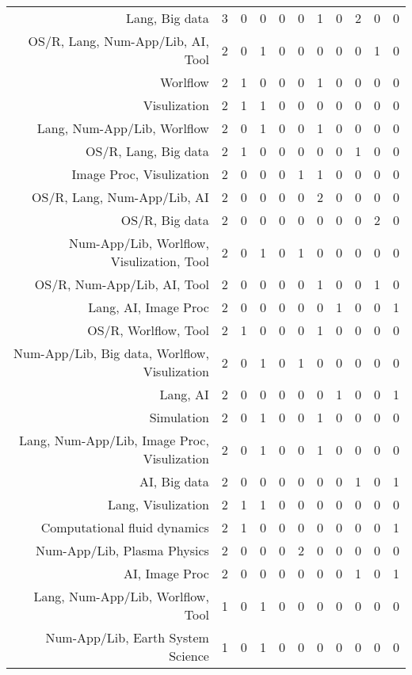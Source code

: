{\begin{landscape}
\begin{longtable}[htb]{r|c|c|c|c|c|c|c|c|c|c}
{Lang, Big data} & 3 & 0 & 0 & 0 & 0 & 1 & 0 & 2 & 0 & 0 \\%
{OS/R, Lang, Num-App/Lib, AI, Tool} & 2 & 0 & 1 & 0 & 0 & 0 & 0 & 0 & 1 & 0 \\%
{Worlflow} & 2 & 1 & 0 & 0 & 0 & 1 & 0 & 0 & 0 & 0 \\%
{Visulization} & 2 & 1 & 1 & 0 & 0 & 0 & 0 & 0 & 0 & 0 \\%
{Lang, Num-App/Lib, Worlflow} & 2 & 0 & 1 & 0 & 0 & 1 & 0 & 0 & 0 & 0 \\%
{OS/R, Lang, Big data} & 2 & 1 & 0 & 0 & 0 & 0 & 0 & 1 & 0 & 0 \\%
{Image Proc, Visulization} & 2 & 0 & 0 & 0 & 1 & 1 & 0 & 0 & 0 & 0 \\%
{OS/R, Lang, Num-App/Lib, AI} & 2 & 0 & 0 & 0 & 0 & 2 & 0 & 0 & 0 & 0 \\%
{OS/R, Big data} & 2 & 0 & 0 & 0 & 0 & 0 & 0 & 0 & 2 & 0 \\%
{Num-App/Lib, Worlflow, Visulization, Tool} & 2 & 0 & 1 & 0 & 1 & 0 & 0 & 0 & 0 & 0 \\%
{OS/R, Num-App/Lib, AI, Tool} & 2 & 0 & 0 & 0 & 0 & 1 & 0 & 0 & 1 & 0 \\%
{Lang, AI, Image Proc} & 2 & 0 & 0 & 0 & 0 & 0 & 1 & 0 & 0 & 1 \\%
{OS/R, Worlflow, Tool} & 2 & 1 & 0 & 0 & 0 & 1 & 0 & 0 & 0 & 0 \\%
{Num-App/Lib, Big data, Worlflow, Visulization} & 2 & 0 & 1 & 0 & 1 & 0 & 0 & 0 & 0 & 0 \\%
{Lang, AI} & 2 & 0 & 0 & 0 & 0 & 0 & 1 & 0 & 0 & 1 \\%
{Simulation} & 2 & 0 & 1 & 0 & 0 & 1 & 0 & 0 & 0 & 0 \\%
{Lang, Num-App/Lib, Image Proc, Visulization} & 2 & 0 & 1 & 0 & 0 & 1 & 0 & 0 & 0 & 0 \\%
{AI, Big data} & 2 & 0 & 0 & 0 & 0 & 0 & 0 & 1 & 0 & 1 \\%
{Lang, Visulization} & 2 & 1 & 1 & 0 & 0 & 0 & 0 & 0 & 0 & 0 \\%
{Computational fluid dynamics} & 2 & 1 & 0 & 0 & 0 & 0 & 0 & 0 & 0 & 1 \\%
{Num-App/Lib, Plasma Physics} & 2 & 0 & 0 & 0 & 2 & 0 & 0 & 0 & 0 & 0 \\%
{AI, Image Proc} & 2 & 0 & 0 & 0 & 0 & 0 & 0 & 1 & 0 & 1 \\%
{Lang, Num-App/Lib, Worlflow, Tool} & 1 & 0 & 1 & 0 & 0 & 0 & 0 & 0 & 0 & 0 \\%
{Num-App/Lib, Earth System Science} & 1 & 0 & 1 & 0 & 0 & 0 & 0 & 0 & 0 & 0 \\%

\end{longtable}
\end{landscape}}
